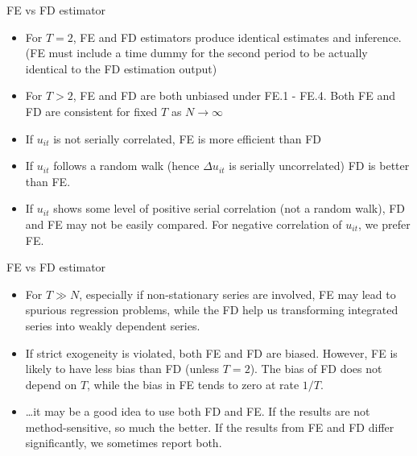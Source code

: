 \documentclass[usenames,dvipsnames]{beamer}
\begin{document}
\begin{frame}{FE vs FD estimator}
\begin{itemize}
\item For $T=2$, FE and FD estimators produce identical estimates and inference. (FE must include a time dummy for the second period to be actually identical to the FD estimation output)
\item For $T>2$, FE and FD are both unbiased under FE.1 - FE.4. Both FE and FD are consistent for fixed $T$ as $N \rightarrow \infty$
\item If $u_{it}$ is not serially correlated, FE is more efficient than FD
\item If $u_{it}$ follows a random walk (hence $\Delta u_{it}$ is serially uncorrelated) FD is better than FE.
\item If $u_{it}$ shows some level of positive serial correlation (not a random walk), FD and FE may not be easily compared. For negative correlation of $u_{it}$, we prefer FE.
\end{itemize}
\end{frame}
\begin{frame}{FE vs FD estimator}
\begin{itemize}
\item For $T \gg N$, especially if non-stationary series are involved, FE may lead to spurious regression problems, while the FD help us transforming integrated series into weakly dependent series.
\item If strict exogeneity is violated, both FE and FD are biased. However, FE is likely to have less bias than FD (unless $T=2$). The bias of FD does not depend on $T$, while the bias in FE tends to zero at rate $1/T$.
\item \dots it may be a good idea to use both FD and FE. If the results are not method-sensitive, so much the better. If the results from FE and FD differ significantly, we sometimes report both.
\end{itemize}
\end{frame}
\end{document}

